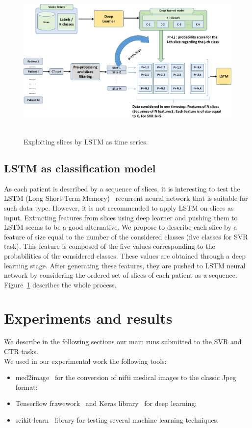 \documentclass{llncs}
\begin{document}
\begin{figure}[!ht]
\includegraphics[width=\textwidth,height=8cm]{lstm.pdf}
\caption{Exploiting slices by LSTM as time series.} 
\label{fig:lstm}
\end{figure}

\subsection{LSTM as classification model}
\label{lstm}
As each patient is described by a sequence of slices, it is interesting to test the LSTM (Long Short-Term Memory)~\cite{lstm1997} recurrent neural network that is suitable for such data type. However, it is not recommended to apply LSTM on slices as input. Extracting features from slices using deep learner and pushing them to LSTM seems to be a good alternative. We propose to describe each slice by a feature of size equal to the number of the considered classes (five classes for SVR task). This feature is composed of the five values corresponding to the probabilities of the considered classes. These values are obtained through a deep learning stage. After generating these features, they are pushed to LSTM neural network by considering the ordered set of slices of each patient as a sequence. Figure~\ref{fig:lstm} describes the whole process.



\section{Experiments and results}
We describe in the following sections our main runs submitted to the SVR and CTR tasks.\\

We used in our experimental work the following tools:
\begin{itemize}
\item med2image~\cite{med2image} for the conversion of nifti medical images to the classic Jpeg format;
\item Tenserflow frawework~\cite{tensorflow2015} and Keras library~\cite{keras2015} for deep learning;
\item scikit-learn~\cite{scikit-learn} library for testing several machine learning techniques.

\end{itemize}
\end{document}
